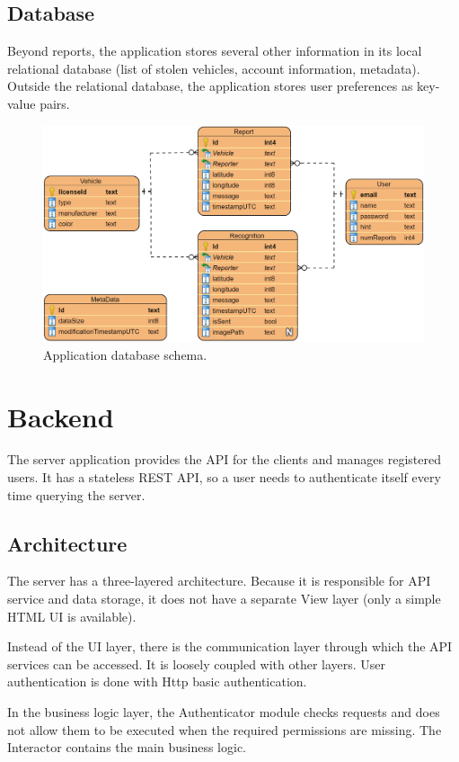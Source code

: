 \subsection{Database}

Beyond reports, the application stores several other information in its local relational database (list of stolen vehicles, account information, metadata). Outside the relational database, the application stores user preferences as key-value pairs.

\begin{figure}[htb]
 \centerline{\includegraphics[width=.85\columnwidth]{.//Figure/System/AppData.PNG}}
 \caption{Application database schema.}
 \label{fig:simple}
\end{figure}

\section{Backend}

The server application provides the API for the clients and manages registered users. It has a stateless REST API, so a user needs to authenticate itself every time querying the server.

\subsection{Architecture}

The server has a three-layered architecture. Because it is responsible for API service and data storage, it does not have a separate View layer (only a simple HTML UI is available).

Instead of the UI layer, there is the communication layer through which the API services can be accessed. It is loosely coupled with other layers. User authentication is done with Http basic authentication.

In the business logic layer, the Authenticator module checks requests and does not allow them to be executed when the required permissions are missing. The Interactor contains the main business logic.

